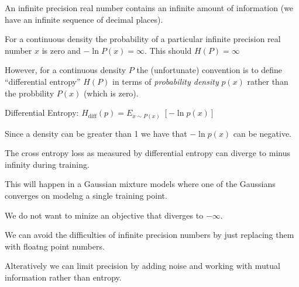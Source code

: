{

An infinite precision real number contains an infinite amount of information (we have an infinite sequence of decimal places).

\vfill
For a continuous density the probability of a particular infinite precision real number $x$ is zero and $-\ln P(x) = \infty$.  This should $H(P) = \infty$

\vfill
However, for a continuous density $P$ the (unfortunate) convention is to define ``differential entropy'' $H(P)$ in terms of {\em probability density} $p(x)$
rather than the probbility $P(x)$ (which is zero).

\vfill
Differential Entropy: $H_\mathrm{diff}(p) = E_{x \sim P(x)}\;\left[-\ln p(x)\right]$


Since a density can be greater than 1 we have that $- \ln p(x)$ can be negative.

\vfill
The cross entropy loss as measured by differential entropy can diverge to minus infinity during training.

\vfill
This will happen in a Gaussian mixture models where one of the Gaussians converges on modelng a single training point.

\vfill
We do not want to minize an objective that diverges to $-\infty$.


We can avoid the difficulties of infinite precision numbers by just replacing them with floatng point numbers.

\vfill
Alteratively we can limit precision by adding noise and working with mutual information rather than entropy.

}
